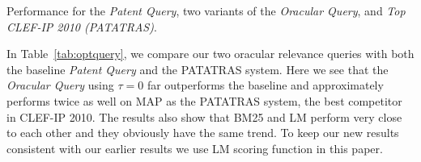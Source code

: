 %
%
%
%

\begin{table}[t!]
  \begin{center}
  \scriptsize
   \caption{Performance for the \textit{ Patent Query}, two variants of the \textit{ Oracular Query}, and \textit{ Top CLEF-IP 2010 (PATATRAS)}.}
   \vspace*{1ex}
     
  \label{tab:optquery}
  \end{center}  
\end{table}

In Table~\ref{tab:optquery}, we compare our two oracular relevance
queries with both the baseline \textit{Patent Query} and the PATATRAS system.  Here we see that
the \emph{Oracular Query} using $\tau=0$ far outperforms the baseline and
approximately performs twice as well on MAP as the PATATRAS system, the best competitor in
CLEF-IP 2010. 
The results also show that BM25 and LM perform very close to each other and they obviously have the same trend. To keep our new results consistent with our earlier results we use LM scoring function in this paper.

